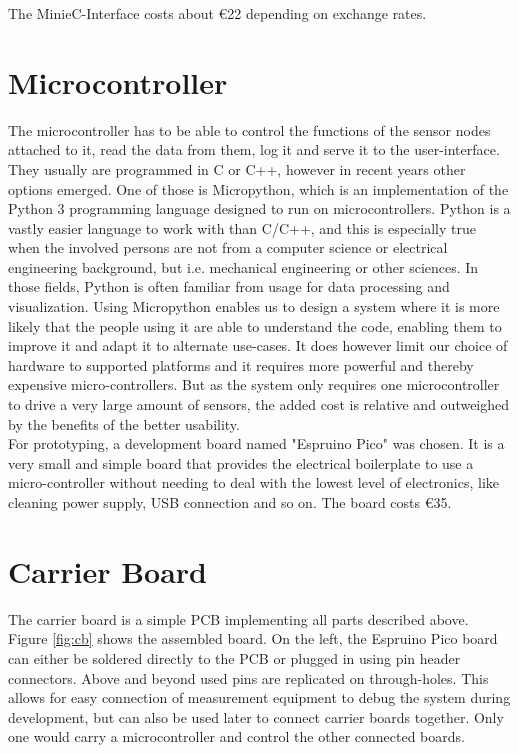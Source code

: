 The MinieC-Interface costs about \euro{22} depending on exchange rates.

\section{Microcontroller} \label{uc}

The microcontroller has to be able to control the functions of the sensor nodes attached to it, read the data from them, log it and serve it to the user-interface. They usually are programmed in C or C++, however in recent years other options emerged. One of those is Micropython, which is an implementation of the Python 3 programming language designed to run on microcontrollers. Python is a vastly easier language to work with than C/C++, and this is especially true when the involved persons are not from a computer science or electrical engineering background, but i.e. mechanical engineering or other sciences. In those fields, Python is often familiar from usage for data processing and visualization. Using Micropython enables us to design a system where it is more likely that the people using it are able to understand the code, enabling them to improve it and adapt it to alternate use-cases.
It does however limit our choice of hardware to supported platforms and it requires more powerful and thereby expensive micro-controllers. But as the system only requires one microcontroller to drive a very large amount of sensors, the added cost is relative and outweighed by the benefits of the better usability.\\

For prototyping, a development board named "Espruino Pico" was chosen. It is a very small and simple board that provides the electrical boilerplate to use a micro-controller without needing to deal with the lowest level of electronics, like cleaning power supply, USB connection and so on. The board costs \euro{35}.\\

\section{Carrier Board}

The carrier board is a simple PCB implementing all parts described above. Figure \ref{fig:cb} shows the assembled board. On the left, the Espruino Pico board can either be soldered directly to the PCB or plugged in using pin header connectors. Above and beyond used pins are replicated on through-holes. This allows for easy connection of measurement equipment to debug the system during development, but can also be used later to connect carrier boards together. Only one would carry a microcontroller and control the other connected boards.

